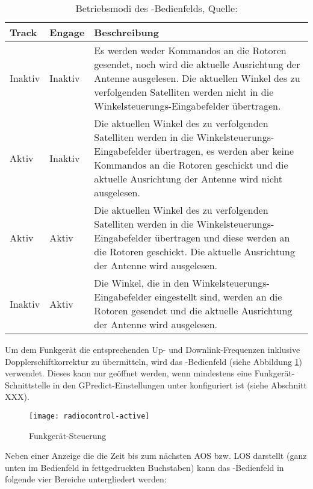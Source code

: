 \begin{table}[h]
	\begin{tabularx}{\textwidth}{|l|l|X|}
		\hline
		\textbf{Track} 	    & \textbf{Engage}	&\textbf{Beschreibung}\\
		\hline
		Inaktiv          	& Inaktiv 			& Es werden weder Kommandos an die Rotoren gesendet, noch wird die aktuelle Ausrichtung der Antenne ausgelesen. Die aktuellen Winkel des zu verfolgenden Satelliten werden nicht in die Winkelsteuerungs-Eingabefelder übertragen.\\
		Aktiv              	& Inaktiv   		& Die aktuellen Winkel des zu verfolgenden Satelliten werden in die Winkelsteuerungs-Eingabefelder übertragen, es werden aber keine Kommandos an die Rotoren geschickt und die aktuelle Ausrichtung der Antenne wird nicht ausgelesen.\\
		Aktiv              	& Aktiv	            & Die aktuellen Winkel des zu verfolgenden Satelliten werden in die Winkelsteuerungs-Eingabefelder übertragen und diese werden an die Rotoren geschickt. Die aktuelle Ausrichtung der Antenne wird ausgelesen.\\
		Inaktiv            	& Aktiv   			& Die Winkel, die in den Winkelsteuerungs-Eingabefelder eingestellt sind, werden an die Rotoren gesendet und die aktuelle Ausrichtung der Antenne wird ausgelesen.\\
		\hline		
	\end{tabularx}
	\caption{Betriebsmodi des -Bedienfelds, Quelle: \cite{gpredictmanual} \vspace{-2em}}
	\label{tab:rotatorcontrolmodes}
\end{table}

\clearpage

Um dem Funkgerät die entsprechenden Up- und Downlink-Frequenzen inklusive Dopplerschiftkorrektur zu übermitteln, wird das -Bedienfeld (siehe Abbildung \ref{fig:radiocontrol}) verwendet. Dieses kann nur geöffnet werden, wenn mindestens eine Funkgerät-Schnittstelle in den GPredict-Einstellungen unter  konfiguriert ist (siehe Abschnitt XXX).

\begin{figure}[h]
	\centering
	\texttt{[image: radiocontrol-active]}
	\caption{Funkgerät-Steuerung}
	\label{fig:radiocontrol} 
\end{figure}

Neben einer Anzeige die die Zeit bis zum nächsten \ac{AOS} bzw. \ac{LOS} darstellt (ganz unten im Bedienfeld in fettgedruckten Buchstaben) kann das -Bedienfeld in folgende vier Bereiche untergliedert werden:

